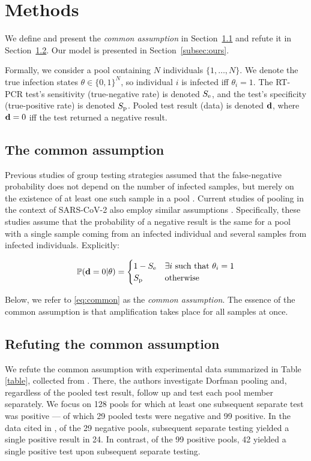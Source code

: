 \documentclass{article}
\begin{document}
\section{Methods}
We define and present the \emph{common assumption} in Section~\ref{subsec:common}
and refute it in Section~\ref{subsec:refute}. Our model is presented
in Section~\ref{subsec:ours}.

Formally, we consider a pool containing $N$ individuals
$\{1,\dots,N\}$. We denote the true infection states $\theta \in
\{0,1\}^N$, so individual $i$ is infected iff $\theta_i=1$. The RT-PCR
test's sensitivity (true-negative rate) is denoted $S_{\text{e}}$, and the
test's specificity (true-positive rate) is denoted $S_{\text{p}}$. Pooled
test result (data) is denoted $\mathbf{d}$, where $\mathbf{d}=0$ iff the test
returned a negative result.

\subsection{The common assumption}\label{subsec:common}
Previous studies of group testing strategies assumed that the
false-negative probability does not depend on the number of infected
samples, but merely on the existence of at least one such sample in a
pool \cite{Kim, OptimalDorfmanPool}. Current studies of pooling in the
context of SARS-CoV-2 also employ similar assumptions
\cite{Simplistic1, Simplistic2}. Specifically, these studies assume
that the probability of a negative result is the same for a pool with
a single sample coming from an infected individual and several
 samples from infected individuals. Explicitly:

\begin{align}\label{eq:common}
  \mathbb{P}(\mathbf{d}=0|\theta) = 
  \begin{cases} 
    1-S_{\text{e}} & \exists i\ \text{such that } \theta_i = 1\\
    S_{\text{p}} & \text{otherwise}
  \end{cases} 
\end{align}

Below, we refer to \eqref{eq:common} as the \emph{common
  assumption}. The essence of the common assumption is that
amplification takes place for all samples at once.


\subsection{Refuting the common assumption}\label{subsec:refute}
We refute the common assumption with experimental data summarized in
Table \ref{table}, collected from \cite{Salazar}. There, the authors
investigate Dorfman pooling and, regardless of the pooled test result,
follow up and test each pool member separately. We focus on 128 pools
for which at least one subsequent separate test was positive --- of
which 29 pooled tests were negative and 99 positive. In the data cited
in \cite{Salazar}, of the 29 negative pools, subsequent separate
testing yielded a single positive result in 24. In contrast, of the 99
positive pools, 42 yielded a single positive test upon subsequent
separate testing.
\end{document}
